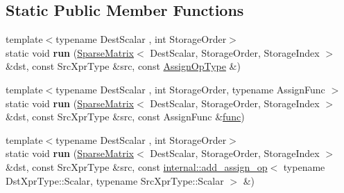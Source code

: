 \subsection*{Static Public Member Functions}
\begin{DoxyCompactItemize}
\item 
\mbox{\label{struct_eigen_1_1internal_1_1_assignment_3_01_dst_xpr_type_00_01_src_xpr_type_00_01_functor_00_017b35cf78061a31c93b838bddfa619fa3_a5c441b141f8149b0c8eb427486eb2cd1}} 
{\footnotesize template$<$typename Dest\+Scalar , int Storage\+Order$>$ }\\static void {\bfseries run} (\hyperlink{group___sparse_core___module_class_eigen_1_1_sparse_matrix}{Sparse\+Matrix}$<$ Dest\+Scalar, Storage\+Order, Storage\+Index $>$ \&dst, const Src\+Xpr\+Type \&src, const \hyperlink{struct_eigen_1_1internal_1_1assign__op}{Assign\+Op\+Type} \&)
\item 
\mbox{\label{struct_eigen_1_1internal_1_1_assignment_3_01_dst_xpr_type_00_01_src_xpr_type_00_01_functor_00_017b35cf78061a31c93b838bddfa619fa3_a77cd302a30c64789f91ba23771433091}} 
{\footnotesize template$<$typename Dest\+Scalar , int Storage\+Order, typename Assign\+Func $>$ }\\static void {\bfseries run} (\hyperlink{group___sparse_core___module_class_eigen_1_1_sparse_matrix}{Sparse\+Matrix}$<$ Dest\+Scalar, Storage\+Order, Storage\+Index $>$ \&dst, const Src\+Xpr\+Type \&src, const Assign\+Func \&\hyperlink{structfunc}{func})
\item 
\mbox{\label{struct_eigen_1_1internal_1_1_assignment_3_01_dst_xpr_type_00_01_src_xpr_type_00_01_functor_00_017b35cf78061a31c93b838bddfa619fa3_a2f4176d30e11f2c578e3e81b399518cb}} 
{\footnotesize template$<$typename Dest\+Scalar , int Storage\+Order$>$ }\\static void {\bfseries run} (\hyperlink{group___sparse_core___module_class_eigen_1_1_sparse_matrix}{Sparse\+Matrix}$<$ Dest\+Scalar, Storage\+Order, Storage\+Index $>$ \&dst, const Src\+Xpr\+Type \&src, const \hyperlink{struct_eigen_1_1internal_1_1add__assign__op}{internal\+::add\+\_\+assign\+\_\+op}$<$ typename Dst\+Xpr\+Type\+::\+Scalar, typename Src\+Xpr\+Type\+::\+Scalar $>$ \&)

\end{DoxyCompactItemize}
